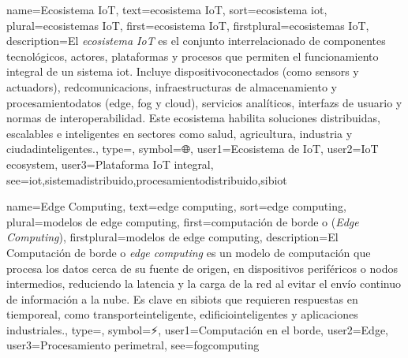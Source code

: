 	{
		name={Ecosistema IoT},
		text={ecosistema IoT},
		sort={ecosistema iot},
		plural={ecosistemas IoT},
		first={ecosistema IoT},
		firstplural={ecosistemas IoT},
		description={El \emph{ecosistema IoT} es el conjunto interrelacionado de componentes tecnol{\'o}gicos, actores, plataformas y procesos que permiten el funcionamiento integral de un sistema \gls{iot}. Incluye \glspl{dispositivoconectado} (como \glspl{sensor} y \glspl{actuador}), \glspl{redcomunicacion}, \glspl{infraestructura} de \gls{almacenamiento} y \gls{procesamientodatos} (edge, fog y cloud), servicios anal{\'i}ticos, \glspl{interfaz} de \gls{usuario} y normas de \gls{interoperabilidad}. Este ecosistema habilita soluciones distribuidas, escalables e inteligentes en sectores como salud, agricultura, industria y \glspl{ciudadinteligente}.},
		type=\glsdefaulttype,
		symbol={🌐},
		user1={Ecosistema de IoT},
		user2={IoT ecosystem},
		user3={Plataforma IoT integral},
		see={iot,sistemadistribuido,procesamientodistribuido,sibiot}
	}
	
	{
		name={Edge Computing},
		text={edge computing},
		sort={edge computing},
		plural={modelos de edge computing},
		first={computaci{\'o}n de borde o (\textit{Edge Computing})},
		firstplural={modelos de edge computing},
		description={El Computaci{\'o}n de borde o \emph{edge computing} es un modelo de computaci{\'o}n que procesa los \glspl{dato} cerca de su fuente de origen, en \glspl{dispositivo} perif{\'e}ricos o nodos intermedios, reduciendo la \gls{latencia} y la carga de la \gls{red} al evitar el env{\'i}o continuo de informaci{\'o}n a la \gls{nube}. Es clave en \glspl{sibiot} que requieren respuestas en \gls{tiemporeal}, como \gls{transporteinteligente}, \glspl{edificiointeligente} y aplicaciones industriales.},
		type=\glsdefaulttype,
		symbol={⚡},
		user1={Computaci{\'o}n en el borde},
		user2={Edge},
		user3={Procesamiento perimetral},
		see={fogcomputing}
	}
	
	
